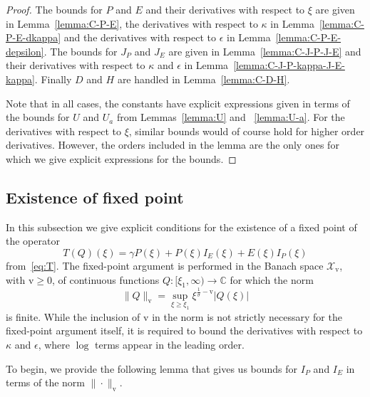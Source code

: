 \documentclass[11pt]{article}
\newcommand{\normv}{\mathrm{v}}
\newcommand{\Space}{\mathcal{X}}
\begin{document}
\begin{proof}
  The bounds for \(P\) and \(E\) and their derivatives with respect to
  \(\xi\) are given in Lemma~\ref{lemma:C-P-E}, the derivatives with
  respect to \(\kappa\) in Lemma~\ref{lemma:C-P-E-dkappa} and the
  derivatives with respect to \(\epsilon\) in
  Lemma~\ref{lemma:C-P-E-depsilon}. The bounds for \(J_{P}\) and
  \(J_{E}\) are given in Lemma~\ref{lemma:C-J-P-J-E} and their
  derivatives with respect to \(\kappa\) and \(\epsilon\) in
  Lemma~\ref{lemma:C-J-P-kappa-J-E-kappa}. Finally \(D\) and \(H\) are
  handled in Lemma~\ref{lemma:C-D-H}.

  Note that in all cases, the constants have explicit expressions
  given in terms of the bounds for \(U\) and \(U_{a}\) from
  Lemmas~\ref{lemma:U} and ~\ref{lemma:U-a}. For the derivatives with
  respect to \(\xi\), similar bounds would of course hold for higher
  order derivatives. However, the orders included in the lemma are the
  only ones for which we give explicit expressions for the bounds.
\end{proof}

\subsection{Existence of fixed point}
\label{sec:fixed-point}
In this subsection we give explicit conditions for the existence of a
fixed point of the operator
\begin{equation*}
  T(Q)(\xi) = \gamma P(\xi) + P(\xi)I_{E}(\xi) + E(\xi)I_{P}(\xi)
\end{equation*}
from~\eqref{eq:T}. The fixed-point argument is performed in the Banach
space \(\Space_\normv\), with \(\normv \geq 0\), of continuous
functions \(Q : [\xi_1, \infty) \to \mathbb{C}\) for which the norm
\begin{equation*}
  \|Q\|_{\normv} = \sup_{\xi \geq \xi_{1}} \xi^{\frac{1}{\sigma} - \normv}|Q(\xi)|
\end{equation*}
is finite. While the inclusion of \(\normv\) in the norm is not
strictly necessary for the fixed-point argument itself, it is required
to bound the derivatives with respect to \(\kappa\) and \(\epsilon\),
where \(\log\) terms appear in the leading order.

To begin, we provide the following lemma that gives us bounds for
\(I_{P}\) and \(I_{E}\) in terms of the norm \(\|\cdot\|_{\normv}\).
\end{document}
